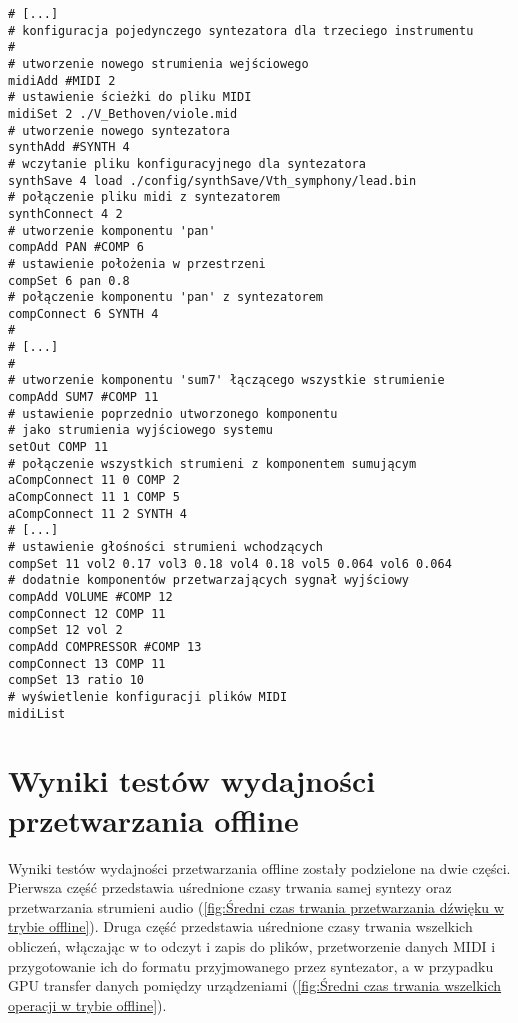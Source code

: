 \begin{lstlisting}
# [...]
# konfiguracja pojedynczego syntezatora dla trzeciego instrumentu
#
# utworzenie nowego strumienia wejściowego
midiAdd #MIDI 2
# ustawienie ścieżki do pliku MIDI
midiSet 2 ./V_Bethoven/viole.mid
# utworzenie nowego syntezatora
synthAdd #SYNTH 4
# wczytanie pliku konfiguracyjnego dla syntezatora
synthSave 4 load ./config/synthSave/Vth_symphony/lead.bin
# połączenie pliku midi z syntezatorem
synthConnect 4 2
# utworzenie komponentu 'pan'
compAdd PAN #COMP 6
# ustawienie położenia w przestrzeni
compSet 6 pan 0.8
# połączenie komponentu 'pan' z syntezatorem
compConnect 6 SYNTH 4
#
# [...]
#
# utworzenie komponentu 'sum7' łączącego wszystkie strumienie
compAdd SUM7 #COMP 11
# ustawienie poprzednio utworzonego komponentu
# jako strumienia wyjściowego systemu
setOut COMP 11
# połączenie wszystkich strumieni z komponentem sumującym
aCompConnect 11 0 COMP 2
aCompConnect 11 1 COMP 5
aCompConnect 11 2 SYNTH 4
# [...]
# ustawienie głośności strumieni wchodzących
compSet 11 vol2 0.17 vol3 0.18 vol4 0.18 vol5 0.064 vol6 0.064
# dodatnie komponentów przetwarzających sygnał wyjściowy
compAdd VOLUME #COMP 12
compConnect 12 COMP 11
compSet 12 vol 2
compAdd COMPRESSOR #COMP 13
compConnect 13 COMP 11
compSet 13 ratio 10
# wyświetlenie konfiguracji plików MIDI
midiList
\end{lstlisting}

\section{Wyniki testów wydajności przetwarzania offline}
Wyniki testów wydajności przetwarzania offline zostały podzielone na dwie części. Pierwsza część przedstawia uśrednione czasy trwania samej syntezy oraz przetwarzania strumieni audio (\ref{fig:Średni czas trwania przetwarzania dźwięku w trybie offline}). Druga część przedstawia uśrednione czasy trwania wszelkich obliczeń, włączając w to odczyt i zapis do plików, przetworzenie danych MIDI i przygotowanie ich do formatu przyjmowanego przez syntezator, a w przypadku GPU transfer danych pomiędzy urządzeniami (\ref{fig:Średni czas trwania wszelkich operacji w trybie offline}).


